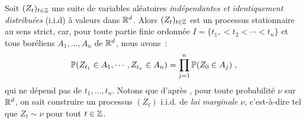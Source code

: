\begin{example}[Processus i.i.d]
\label{exple:iid}
Soit $(Z_t)_{t\in \mathbb{Z}}$ une suite de variables al\'eatoires \emph{ind\'ependantes et
  identiquement distribu\'ees} (i.i.d) \`a valeurs dans
$\mathbb{R}^d$. Alors $(Z_t)_{t\in \mathbb{Z}}$ est
un processus stationnaire au sens strict, car, pour toute partie finie ordonn\'ee
$I = \{ t_1, < t_2 < \cdots < t_n \}$ et tous bor\'eliens $A_1,\dots,A_n$ de
$\mathbb{R}^d$, nous
avons~:
\[
 \mathbb{P} ( Z_{t_1} \in A_1, \cdots, Z_{t_n} \in A_n)
 =
 \prod_{j=1}^n \mathbb{P}(Z_0 \in A_j)\;,
\]
qui ne d\'epend pas de $t_1,\dots,t_n$. Notons que d'apr\`es , pour toute probabilit\'e $\nu$ sur $\mathbb{R}^d$, on
sait construire un processus $(Z_t)$ i.i.d. de \emph{loi marginale} 
$\nu$, c'est-\`a-dire tel que $Z_t\sim \nu$ pour tout $t\in \mathbb{Z}$.
\end{example}

